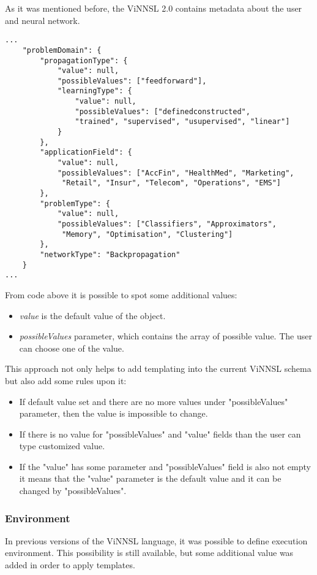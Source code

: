 As it was mentioned before, the ViNNSL 2.0 contains metadata about the user and neural network.

\begin{lstlisting}[caption=ViNNSL template metadata]
...
	"problemDomain": {
		"propagationType": {
			"value": null,
			"possibleValues": ["feedforward"],
			"learningType": {
				"value": null,
				"possibleValues": ["definedconstructed", 
				"trained", "supervised", "usupervised", "linear"]
			}
		},
		"applicationField": {
			"value": null,
			"possibleValues": ["AccFin", "HealthMed", "Marketing",
			 "Retail", "Insur", "Telecom", "Operations", "EMS"]
		},
		"problemType": {
			"value": null,
			"possibleValues": ["Classifiers", "Approximators",
			 "Memory", "Optimisation", "Clustering"]
		},
		"networkType": "Backpropagation"
	}
...
\end{lstlisting}

From code above it is possible to spot some additional values:
\begin{itemize}
\item \emph{value} is the default value of the object. 
\item \emph{possibleValues} parameter, which contains the array of possible value. The user can choose one of the value. 
\end{itemize}

This approach not only helps to add templating into the current ViNNSL schema but also add some rules upon it:
\begin{itemize}
\item If default value set and there are no more values under "possibleValues" parameter, then the value is impossible to change.
\item If there is no value for "possibleValues" and "value" fields than the user can type customized value.
\item If the "value" has some parameter and "possibleValues" field is also not empty it means that the "value" parameter is the default value and it can be changed by "possibleValues".
\end{itemize}

\subsubsection{Environment}\label{Environment}

In previous versions of the ViNNSL language, it was possible to define execution environment. This possibility is still available, but some additional value was added in order to apply templates. 

